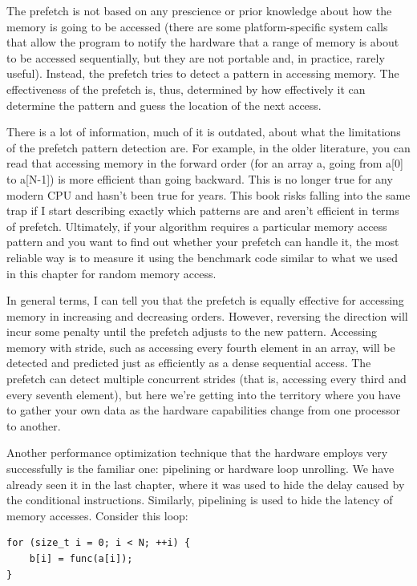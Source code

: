 The prefetch is not based on any prescience or prior knowledge about how the memory is going to be accessed (there are some platform-specific system calls that allow the program to notify the hardware that a range of memory is about to be accessed sequentially, but they are not portable and, in practice, rarely useful). Instead, the prefetch tries to detect a pattern in accessing memory. The effectiveness of the prefetch is, thus, determined by how effectively it can determine the pattern and guess the location of the next access.

There is a lot of information, much of it is outdated, about what the limitations of the prefetch pattern detection are. For example, in the older literature, you can read that accessing memory in the forward order (for an array a, going from a[0] to a[N-1]) is more efficient than going backward. This is no longer true for any modern CPU and hasn't been true for years. This book risks falling into the same trap if I start describing exactly which patterns are and aren't efficient in terms of prefetch. Ultimately, if your algorithm requires a particular memory access pattern and you want to find out whether your prefetch can handle it, the most reliable way is to measure it using the benchmark code similar to what we used in this chapter for random memory access.

In general terms, I can tell you that the prefetch is equally effective for accessing memory in increasing and decreasing orders. However, reversing the direction will incur some penalty until the prefetch adjusts to the new pattern. Accessing memory with stride, such as accessing every fourth element in an array, will be detected and predicted just as efficiently as a dense sequential access. The prefetch can detect multiple concurrent strides (that is, accessing every third and every seventh element), but here we're getting into the territory where you have to gather your own data as the hardware capabilities change from one processor to another.

Another performance optimization technique that the hardware employs very successfully is the familiar one: pipelining or hardware loop unrolling. We have already seen it in the last chapter, where it was used to hide the delay caused by the conditional instructions. Similarly, pipelining is used to hide the latency of memory accesses. Consider this loop:

\begin{lstlisting}[style=styleCXX]
for (size_t i = 0; i < N; ++i) {
	b[i] = func(a[i]);
}
\end{lstlisting}

